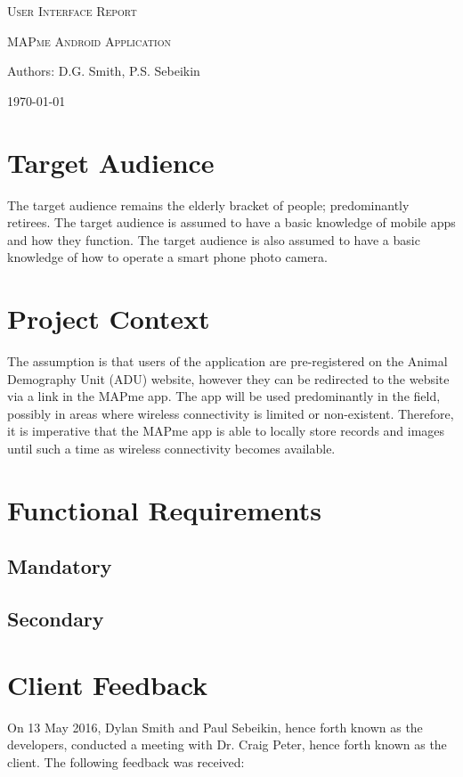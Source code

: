 \documentclass[12pt,a4paper,oneside]{report}
\begin{document}
\begin{titlepage}
	\centering
	{\scshape\LARGE User Interface Report \par}
	\vspace{1cm}
	{\scshape\Large MAPme Android Application\par}
	\vspace{1.5cm}
	{\LARGE Authors: D.G. Smith, P.S. Sebeikin\par}
	\vspace{2cm}
	{\large \today\par}
\end{titlepage}
\tableofcontents
\pagebreak

\section{Target Audience}
The target audience remains the elderly bracket of people; predominantly retirees.  The target audience is assumed to have a basic knowledge of mobile apps and how they function.  The target audience is also assumed to have a basic knowledge of how to operate a smart phone photo camera.

\section{Project Context}
The assumption is that users of the application are pre-registered on the Animal Demography Unit (ADU) website, however they can be redirected to the website via a link in the MAPme app.  The app will be used predominantly in the field, possibly in areas where wireless connectivity is limited or non-existent.  Therefore, it is imperative that the MAPme app is able to locally store records and images until such a time as wireless connectivity becomes available.

\section{Functional Requirements}
\subsection{Mandatory}
\subsection{Secondary}

\section{Client Feedback}
On 13 May 2016, Dylan Smith and Paul Sebeikin, hence forth known as the developers, conducted a meeting with Dr. Craig Peter, hence forth known as the client.  The following feedback was received:
\end{document}
